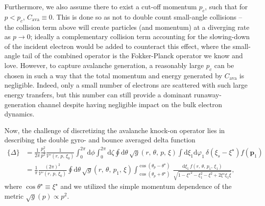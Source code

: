 \documentclass[11pt,a4paper]{article}
\newcommand{\rd}{\ensuremath{\mathrm{d}}}
\newcommand{\sub}[1]{\ensuremath{_{\text{#1}}}}
\begin{document}
Furthermore, we also assume there to exist a cut-off momentum $p_c$, such that for $p<p_c$, $C\sub{ava}\equiv 0$. This is done so as not to double count small-angle collisions -- the collision term above will create particles (and momentum) at a diverging rate as $p\to 0$; ideally a complementary collision term accounting for the slowing-down of the incident electron would be added to counteract this effect, where the small-angle tail of the combined operator is the Fokker-Planck operator we know and love. However, to capture avalanche generation, a reasonably large $p_c$ can be chosen in such a way that the total momentum and energy generated by $C\sub{ava}$ is negligible. Indeed, only a small number of electrons are scattered with such large energy transfers, but this number can still provide a dominant runaway-generation channel despite having negligible impact on the bulk electron dynamics.

Now, the challenge of discretizing the avalanche knock-on operator lies in describing the double gyro- and bounce averaged delta function
\begin{align}
\{\Delta\} &= \frac{1}{2\pi}\frac{p_1^2}{p^2}\frac{1}{\mathcal{V}'(r,\,p,\,\xi_0)}\int_0^{2\pi} \rd \phi \int_0^{2\pi} \rd \zeta \oint \rd\theta \,\sqrt{g}(r,\,\theta,\,p,\,\xi)\int \rd\xi_1\rd\varphi_1 \,\delta(\xi_s-\xi^\star)f(\mathbf{p}_1) \nonumber \\
&= \frac{1}{\pi}\frac{(2\pi)^2}{\mathcal{V}'(r,\,p,\,\xi_0)}\oint \rd\theta \,\sqrt{g}(r,\,\theta,\,p_1,\,\xi)\int_{\cos(\theta_p+\theta^\star)}^{\cos(\theta_p-\theta^\star)}\,\frac{\rd \xi_1 \, f(r,\,\theta,\,p_1,\,\xi_1)}{\sqrt{1-{\xi^\star}^2-\xi_1^2-\xi^2+2\xi^\star\xi_1\xi}},
\end{align}
where $\cos\theta^\star \equiv \xi^\star$ and we utilized the simple momentum dependence of the metric $\sqrt{g}(p)\propto p^2$. 
\end{document}
